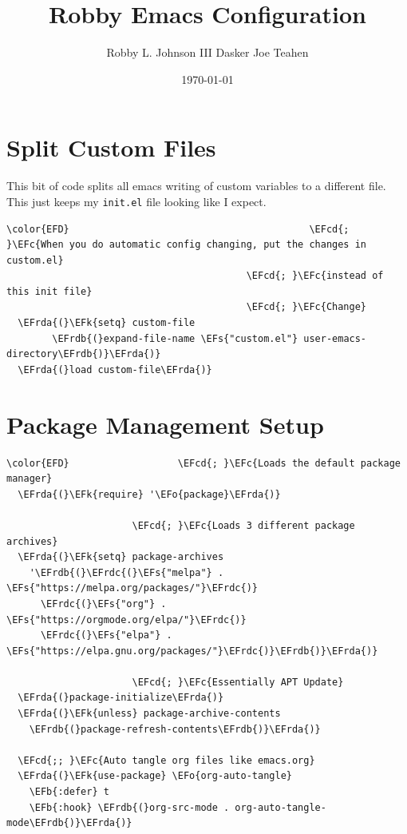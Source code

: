 \documentclass[11pt]{article}
\author{Robby L. Johnson III Dasker Joe Teahen}
\date{\today}
\title{Robby Emacs Configuration}
\newcommand{\EFc}[1]{\textcolor{EFc}{#1}} %
\newcommand{\EFcd}[1]{\textcolor{EFcd}{#1}} %
\newcommand{\EFs}[1]{\textcolor{EFs}{#1}} %
\newcommand{\EFk}[1]{\textcolor{EFk}{#1}} %
\newcommand{\EFb}[1]{\textcolor{EFb}{#1}} %
\newcommand{\EFo}[1]{\textcolor{EFo}{#1}} %
\newcommand{\EFrda}[1]{\textcolor{EFrda}{#1}} %
\newcommand{\EFrdb}[1]{\textcolor{EFrdb}{#1}} %
\newcommand{\EFrdc}[1]{\textcolor{EFrdc}{#1}} %
\begin{document}
\maketitle
\tableofcontents


\section{Split Custom Files}
\label{sec:orgef8d29a}
This bit of code splits all emacs writing of custom variables to a different file. This just keeps my \texttt{init.el} file looking like I expect.

\begin{Code}
\begin{Verbatim}
\color{EFD}                                          \EFcd{; }\EFc{When you do automatic config changing, put the changes in custom.el}
                                          \EFcd{; }\EFc{instead of this init file}
                                          \EFcd{; }\EFc{Change}
  \EFrda{(}\EFk{setq} custom-file
        \EFrdb{(}expand-file-name \EFs{"custom.el"} user-emacs-directory\EFrdb{)}\EFrda{)}
  \EFrda{(}load custom-file\EFrda{)}
\end{Verbatim}
\end{Code}

\section{Package Management Setup}
\label{sec:org4c8c98a}
\begin{Code}
\begin{Verbatim}
\color{EFD}					  \EFcd{; }\EFc{Loads the default package manager}
  \EFrda{(}\EFk{require} '\EFo{package}\EFrda{)}

					  \EFcd{; }\EFc{Loads 3 different package archives}
  \EFrda{(}\EFk{setq} package-archives
	'\EFrdb{(}\EFrdc{(}\EFs{"melpa"} . \EFs{"https://melpa.org/packages/"}\EFrdc{)}
	  \EFrdc{(}\EFs{"org"} . \EFs{"https://orgmode.org/elpa/"}\EFrdc{)}
	  \EFrdc{(}\EFs{"elpa"} . \EFs{"https://elpa.gnu.org/packages/"}\EFrdc{)}\EFrdb{)}\EFrda{)}

					  \EFcd{; }\EFc{Essentially APT Update}
  \EFrda{(}package-initialize\EFrda{)}
  \EFrda{(}\EFk{unless} package-archive-contents
    \EFrdb{(}package-refresh-contents\EFrdb{)}\EFrda{)}

  \EFcd{;; }\EFc{Auto tangle org files like emacs.org}
  \EFrda{(}\EFk{use-package} \EFo{org-auto-tangle}
    \EFb{:defer} t
    \EFb{:hook} \EFrdb{(}org-src-mode . org-auto-tangle-mode\EFrdb{)}\EFrda{)}
\end{Verbatim}
\end{Code}
\end{document}
